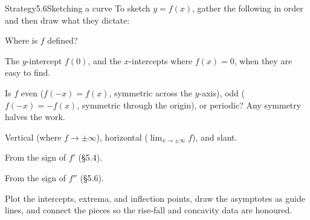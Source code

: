 \documentclass[a4paper,12pt,oneside]{memoir}
\begin{document}
\begin{envstrategy}{Strategy}{5.6}{Sketching a curve}
To sketch \(y = f(x)\), gather the following in order and then draw what they dictate:

\begin{steps}
  \item {} Where is \(f\) defined?
  \item {} The \(y\)-intercept \(f(0)\), and the \(x\)-intercepts where \(f(x) = 0\), when they are easy to find.
  \item {} Is \(f\) even (\(f(-x) = f(x)\), symmetric across the \(y\)-axis), odd (\(f(-x) = -f(x)\), symmetric through the origin), or periodic? Any symmetry halves the work.
  \item {} Vertical (where \(f \to \pm\infty\)), horizontal (\(\lim_{x \to \pm\infty} f\)), and slant.
  \item {} From the sign of \(f'\) (§5.4).
  \item {} From the sign of \(f''\) (§5.6).
  \item {} Plot the intercepts, extrema, and inflection points, draw the asymptotes as guide lines, and connect the pieces so the rise-fall and concavity data are honoured.
\end{steps}
\end{envstrategy}
\end{document}
